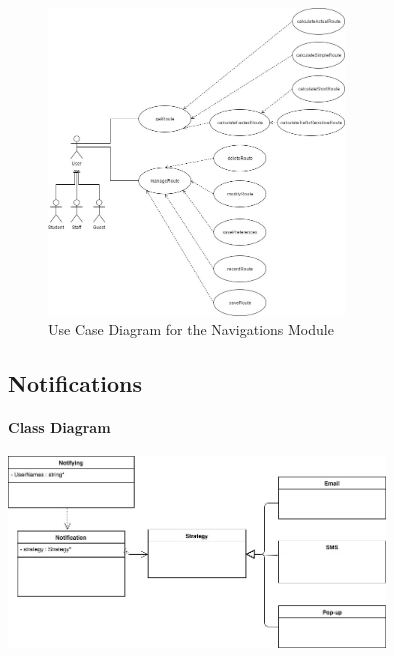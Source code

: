 \documentclass[runningheads,a4paper]{article}
\begin{document}
\begin{figure}[H]
   	\centering
   	\includegraphics[width=0.7\textwidth]{Navigation-Module-Use-Case.jpg}
   	\caption{Use Case Diagram for the Navigations Module}
\end{figure}


\subsection{Notifications}

\paragraph{Class Diagram}
\begin{center}
\includegraphics[width=10cm]{ClassDiagram.png}\\
\end{center}
\end{document}
